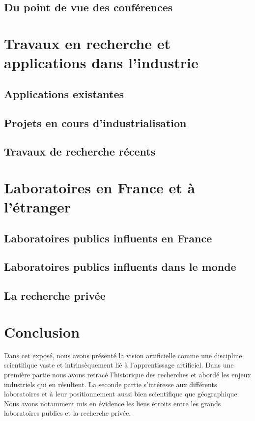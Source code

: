\documentclass{article}
\begin{document}
\subsection{Du point de vue des conférences}

\section{Travaux en recherche et applications dans l'industrie}
\subsection{Applications existantes}
\subsection{Projets en cours d'industrialisation}
\subsection{Travaux de recherche récents}

\section{Laboratoires en France et à l'étranger}
\subsection{Laboratoires publics influents en France}
\subsection{Laboratoires publics influents dans le monde}
\subsection{La recherche privée}

\newpage

\section{Conclusion}

Dans cet exposé, nous avons présenté la vision artificielle comme une discipline scientifique vaste et intrinsèquement lié à l'apprentissage artificiel.
Dans une première partie nous avons retracé l'historique des recherches et abordé les enjeux industriels qui en résultent.
La seconde partie s'intéresse aux différents laboratoires et à leur positionnement aussi bien scientifique que géographique. Nous avons notamment mis en évidence les liens étroits entre les grands laboratoires publics et la recherche privée.
\end{document}
